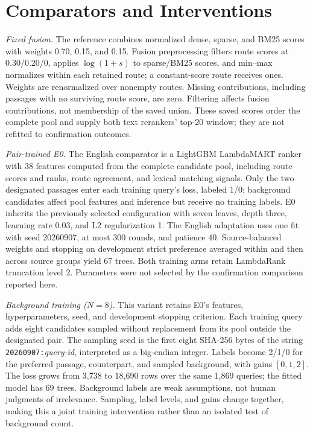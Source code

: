\section{Comparators and Interventions}
\label{sec:methods}

\textit{Fixed fusion.} The reference combines normalized dense, sparse, and BM25 scores with weights 0.70, 0.15, and 0.15. Fusion preprocessing filters route scores at 0.30/0.20/0, applies $\log(1+s)$ to sparse/BM25 scores, and min--max normalizes within each retained route; a constant-score route receives ones. Weights are renormalized over nonempty routes. Missing contributions, including passages with no surviving route score, are zero. Filtering affects fusion contributions, not membership of the saved union. These saved scores order the complete pool and supply both text rerankers' top-20 window; they are not refitted to confirmation outcomes.

\textit{Pair-trained E0.} The English comparator is a LightGBM LambdaMART ranker~\cite{ke2017lightgbm} with 38 features computed from the complete candidate pool, including route scores and ranks, route agreement, and lexical matching signals. Only the two designated passages enter each training query's loss, labeled 1/0; background candidates affect pool features and inference but receive no training labels. E0 inherits the previously selected configuration with seven leaves, depth three, learning rate 0.03, and L2 regularization 1. The English adaptation uses one fit with seed 20260907, at most 300 rounds, and patience 40. Source-balanced weights and stopping on development strict preference averaged within and then across source groups yield 67 trees. Both training arms retain LambdaRank truncation level 2. Parameters were not selected by the confirmation comparison reported here.

\textit{Background training ($N=8$).} This variant retains E0's features, hyperparameters, seed, and development stopping criterion. Each training query adds eight candidates sampled without replacement from its pool outside the designated pair. The sampling seed is the first eight SHA-256 bytes of the string \texttt{20260907:}\textit{query-id}, interpreted as a big-endian integer. Labels become 2/1/0 for the preferred passage, counterpart, and sampled background, with gains $[0,1,2]$. The loss grows from 3,738 to 18,690 rows over the same 1,869 queries; the fitted model has 69 trees. Background labels are weak assumptions, not human judgments of irrelevance. Sampling, label levels, and gains change together, making this a joint training intervention rather than an isolated test of background count.

